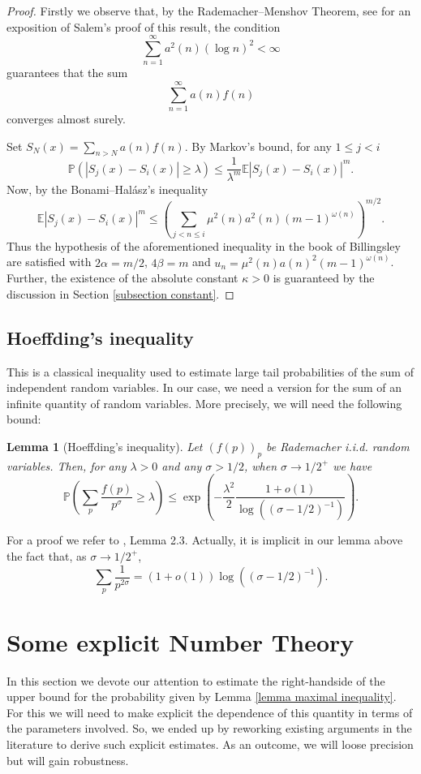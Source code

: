 \documentclass[reqno0,12pt]{amsart}
\newtheorem{lemma}{Lemma}[section]
\theoremstyle{remark}
\newcommand{\EE}{\mathbb{E}}
\newcommand{\PP}{\mathbb{P}}
\begin{document}
\begin{proof} Firstly we observe that, by the Rademacher--Menshov Theorem, see \cite{meaney} for an exposition of Salem's proof of this result, the condition 
$$\sum_{n=1}^\infty a^2(n)(\log n)^2<\infty$$ 
guarantees that the sum
$$\sum_{n=1}^\infty a(n)f(n)$$
converges almost surely.
 
  Set $S_N(x)=\sum_{n>N}a(n)f(n)$. By Markov's bound, for any $1\leq j <i$
$$\PP(|S_j(x)-S_i(x)|\geq \lambda)\leq \frac{1}{\lambda^m}\EE|S_j(x)-S_i(x)|^m.$$
Now, by the Bonami--Halász's inequality
$$\EE|S_j(x)-S_i(x)|^m\leq \left(\sum_{j<n\leq i}\mu^2(n)a^2(n)(m-1)^{\omega(n)}\right)^{m/2}.$$
Thus the hypothesis of the aforementioned inequality in the book of Billingsley \cite{billingsley_convergence_prob_meas} are satisfied with $2\alpha=m/2$, $4\beta=m$ and $u_n=\mu^2(n)a(n)^2(m-1)^{\omega(n)}$. Further, the existence of the absolute constant $\kappa>0$ is guaranteed by the discussion in Section \ref{subsection constant}. \end{proof}

\subsection{Hoeffding's inequality} This is a classical inequality used to estimate large tail probabilities of the sum of independent random variables. In our case, we need a version for the sum of an infinite quantity of random variables. More precisely, we will need the following bound:
\begin{lemma}[Hoeffding's inequality]\label{lemma hoeffding} Let $(f(p))_p$ be Rademacher i.i.d. random variables. Then, for any $\lambda>0$ and any $\sigma>1/2$, when $\sigma\to1/2^+$ we have
$$\PP\left(\sum_{p}\frac{f(p)}{p^{\sigma}}\geq \lambda\right)\leq\exp\left(-\frac{\lambda^2}{2}\frac{1+o(1)}{\log((\sigma-1/2)^{-1})}\right).$$
\end{lemma}

For a proof we refer to \cite{aymoneLIL}, Lemma 2.3. Actually, it is implicit in our lemma above the fact that, as $\sigma\to 1/2^+$,
\begin{equation}\label{equation estimate sum over prime powers}
\sum_p\frac{1}{p^{2\sigma}}=(1+o(1))\log((\sigma-1/2)^{-1}).
\end{equation} 

\section{Some explicit Number Theory}
In this section we devote our attention to estimate the right-handside of the upper bound for the probability given by Lemma \ref{lemma maximal inequality}. For this we will need to make explicit the dependence of this quantity in terms of the parameters involved. So, we ended up by reworking existing arguments in the literature to derive such explicit estimates. As an outcome, we will loose precision but will gain robustness.
\end{document}
